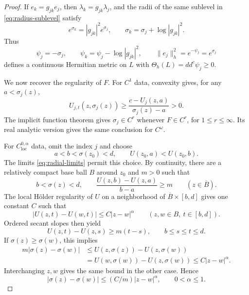 \documentclass[11pt]{amsart}
\theoremstyle{definition}
\theoremstyle{remark}
\numberwithin{equation}{section}
\newcommand{\ddc}{dd^c}
\begin{document}
\begin{proof}
If $e_k=g_{jk}e_j$, then $\lambda_k=g_{jk}\lambda_j$, and the
radii of the same sublevel in \eqref{eq:radius-sublevel} satisfy
\[
 e^{\sigma_k}=|g_{jk}|^2e^{\sigma_j},\qquad
 \sigma_k=\sigma_j+\log|g_{jk}|^2.
\]
Thus
\begin{equation}\label{eq:radius-metric}
 \psi_j=-\sigma_j,\qquad
 \psi_k=\psi_j-\log|g_{jk}|^2,\qquad
 \|e_j\|_h^2=e^{-\psi_j}=e^{\sigma_j}
\end{equation}
defines a continuous Hermitian metric on $L$ with
$\Theta_h(L)=\ddc\psi_j\ge0$.

We now recover the regularity of $F$. For $C^1$ data,
convexity gives, for any $a<\sigma_j(z)$,
\begin{equation}\label{eq:radius-transversality}
 U_{j,t}(z,\sigma_j(z))
 \ge\frac{c-U_j(z,a)}{\sigma_j(z)-a}>0.
\end{equation}
The implicit function theorem gives $\sigma_j\in C^r$ whenever
$F\in C^r$, for $1\le r\le\infty$. Its real analytic version gives
the same conclusion for $C^\omega$.

For $C^{0,\alpha}_{\mathrm{loc}}$ data, omit the index $j$ and
choose
\[
 a<b<\sigma(z_0)<d,\qquad U(z_0,a)<U(z_0,b).
\]
The limits \eqref{eq:radial-limits} permit this choice.
By continuity, there are a relatively compact base ball $B$
around $z_0$ and $m>0$ such that
\[
 b<\sigma(z)<d,\qquad
 \frac{U(z,b)-U(z,a)}{b-a}\ge m
 \qquad(z\in\overline B).
\]
The local H\"older regularity of $U$ on a neighborhood of
$\overline B\times[b,d]$ gives one constant $C$ such that
\[
 |U(z,t)-U(w,t)|\le C|z-w|^\alpha
 \qquad(z,w\in B,\ t\in[b,d]).
\]
Ordered secant slopes then yield
\[
 U(z,t)-U(z,s)\ge m(t-s),\qquad b\le s\le t\le d.
\]
If $\sigma(z)\ge\sigma(w)$, this implies
\begin{align*}
 m|\sigma(z)-\sigma(w)|
 &\le U(z,\sigma(z))-U(z,\sigma(w))\\
 &=U(w,\sigma(w))-U(z,\sigma(w))
 \le C|z-w|^\alpha.
\end{align*}
Interchanging $z,w$ gives the same bound in the other case. Hence
\begin{equation}\label{eq:holder-radius}
 |\sigma(z)-\sigma(w)|\le(C/m)|z-w|^\alpha,
 \qquad 0<\alpha\le1.
\end{equation}


\end{proof}
\end{document}
